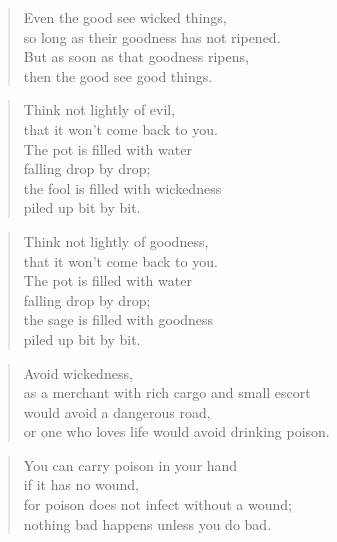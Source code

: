 \documentclass[12pt,openany]{book}%
\begin{document}
\begin{verse}%
Even the good see wicked things, \\
so long as their goodness has not ripened. \\
But as soon as that goodness ripens, \\
then the good see good things. 

%
\end{verse}

\begin{verse}%
Think not lightly of evil, \\
that it won’t come back to you. \\
The pot is filled with water \\
falling drop by drop; \\
the fool is filled with wickedness \\
piled up bit by bit. 

%
\end{verse}

\begin{verse}%
Think not lightly of goodness, \\
that it won’t come back to you. \\
The pot is filled with water \\
falling drop by drop; \\
the sage is filled with goodness \\
piled up bit by bit. 

%
\end{verse}

\begin{verse}%
Avoid wickedness, \\
as a merchant with rich cargo and small escort \\
would avoid a dangerous road, \\
or one who loves life would avoid drinking poison. 

%
\end{verse}

\begin{verse}%
You can carry poison in your hand \\
if it has no wound, \\
for poison does not infect without a wound; \\
nothing bad happens unless you do bad. 

%
\end{verse}
\end{document}
